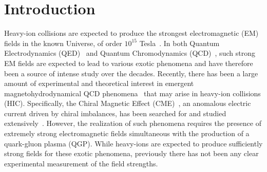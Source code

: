 \documentclass[twocolumn,epjc3]{svjour3}\sloppy
\begin{document}
\setcounter{tocdepth}{3}
\tableofcontents
%
%
\section{Introduction}
\label{intro}
Heavy-ion collisions are expected to produce the strongest electromagnetic (EM) fields in the known Universe, of order $10^{15}$ Tesla~\cite{Norbeck2006,skokovEstimateMagneticField2009,mclerranCommentsElectromagneticField2014}.  In both Quantum Electrodynamics (QED)~\cite{battestiHighMagneticFields2018,hattoriVacuumBirefringenceStrong2013} and Quantum Chromodynamics (QCD)~\cite{asakawaElectricChargeSeparation2010,skokovChiralMagneticEffect2017}, such strong EM fields are expected to lead to various exotic phenomena and have therefore been a source of intense study over the decades. Recently, there has been a large amount of experimental and theoretical interest in emergent magnetohydrodynamical QCD phenomena~\cite{kharzeevChiralMagneticVortical2015} that may arise in heavy-ion collisions (HIC). Specifically, the Chiral Magnetic Effect (CME)~\cite{fukushimaChiralMagneticEffect2008a,kharzeevEffectsTopologicalCharge2007}, an anomalous electric current driven by chiral imbalances, has been searched for and studied extensively~\cite{buividovichNumericalEvidenceChiral2009,wangSearchChiralMagnetic2018,zhaoExperimentalSearchesChiral2019}. However, the realization of such phenomena requires the presence of extremely strong electromagnetic fields simultaneous with the production of a quark-gluon plasma (QGP). While heavy-ions are expected to produce sufficiently strong fields for these exotic phenomena, previously there has not been any clear experimental measurement of the field strengths. 
\end{document}
